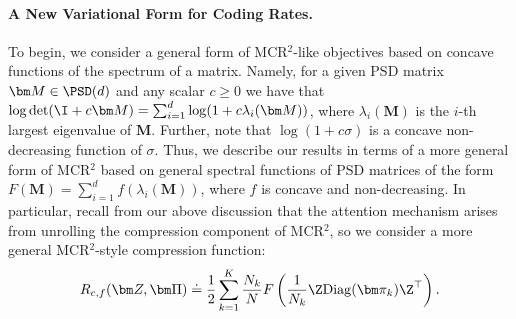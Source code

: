 \documentclass[../../book-main.tex]{subfiles}
\begin{document}
 

\paragraph{A New Variational Form for Coding Rates.} To begin, we consider a general form of MCR$^2$-like objectives based on concave functions of the spectrum of a matrix.  Namely, for a given PSD matrix $\bm M \in \PSD(d)$ and any scalar $c \geq 0$ we have that $\log \det (\I + c \bm M) = \sum_{i=1}^{d} \log( 1 + c \lambda_i(\bm M))$, where $\lambda_i (\bm M)$ is the $i$-th largest eigenvalue of $\bm M$.  Further, note that $\log(1 + c \sigma)$ is a concave non-decreasing function of $\sigma$.  Thus, we describe our results in terms of a more general form of MCR$^2$ based on general spectral functions of PSD matrices of the form $F(\bm M) = \sum_{i=1}^{d} f(\lambda_i(\bm M))$, where $f$ is concave and non-decreasing.  In particular, recall from our above discussion that the attention mechanism arises from unrolling the compression component of MCR$^2$, so we consider a more general MCR$^2$-style compression function:
\vspace{-2mm}
\begin{equation}
    R_{c,f}(\bm Z,\bm \Pi) \doteq \frac{1}{2}\sum_{k=1}^K \frac{N_k}{N} F\left( \frac{1}{N_k}\Z \mathrm{Diag}(\bm \pi_k) \Z^{\top} \right).
    \label{eq:mcr_c_gen}
\end{equation}
\end{document}

